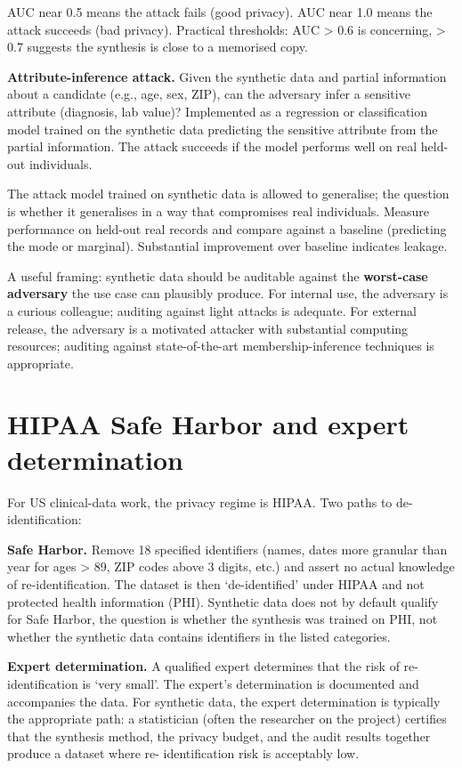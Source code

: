 \documentclass[
  letterpaper,
  11pt]{scrbook}
\begin{document}
AUC near 0.5 means the attack fails (good privacy). AUC near 1.0 means
the attack succeeds (bad privacy). Practical thresholds: AUC
\textgreater{} 0.6 is concerning, \textgreater{} 0.7 suggests the
synthesis is close to a memorised copy.

\textbf{Attribute-inference attack.} Given the synthetic data and
partial information about a candidate (e.g., age, sex, ZIP), can the
adversary infer a sensitive attribute (diagnosis, lab value)?
Implemented as a regression or classification model trained on the
synthetic data predicting the sensitive attribute from the partial
information. The attack succeeds if the model performs well on real
held-out individuals.

The attack model trained on synthetic data is allowed to generalise; the
question is whether it generalises in a way that compromises real
individuals. Measure performance on held-out real records and compare
against a baseline (predicting the mode or marginal). Substantial
improvement over baseline indicates leakage.

A useful framing: synthetic data should be auditable against the
\textbf{worst-case adversary} the use case can plausibly produce. For
internal use, the adversary is a curious colleague; auditing against
light attacks is adequate. For external release, the adversary is a
motivated attacker with substantial computing resources; auditing
against state-of-the-art membership-inference techniques is appropriate.

\section{HIPAA Safe Harbor and expert
determination}\label{hipaa-safe-harbor-and-expert-determination}

For US clinical-data work, the privacy regime is HIPAA. Two paths to
de-identification:

\textbf{Safe Harbor.} Remove 18 specified identifiers (names, dates more
granular than year for ages \textgreater{} 89, ZIP codes above 3 digits,
etc.) and assert no actual knowledge of re-identification. The dataset
is then `de-identified' under HIPAA and not protected health information
(PHI). Synthetic data does not by default qualify for Safe Harbor, the
question is whether the synthesis was trained on PHI, not whether the
synthetic data contains identifiers in the listed categories.

\textbf{Expert determination.} A qualified expert determines that the
risk of re-identification is `very small'. The expert's determination is
documented and accompanies the data. For synthetic data, the expert
determination is typically the appropriate path: a statistician (often
the researcher on the project) certifies that the synthesis method, the
privacy budget, and the audit results together produce a dataset where
re- identification risk is acceptably low.
\end{document}
